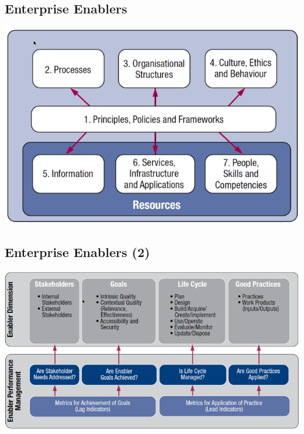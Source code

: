 \documentclass[8pt]{extarticle}
\begin{document}
\begin{multicols}{3}
\subsection{Enterprise Enablers}
\begin{center}
    \includegraphics[width=\columnwidth]{cobit-enterprise-enablers.png}
\end{center}

\subsection{Enterprise Enablers (2)}
\begin{center}
    \includegraphics[width=\columnwidth]{cobit-enterprise-enablers-2.png}
\end{center}


\end{multicols}
\end{document}
